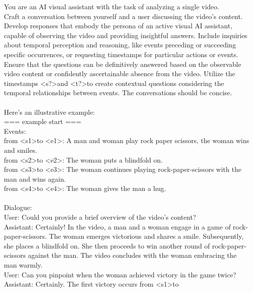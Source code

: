 \documentclass[10pt,twocolumn,letterpaper]{article}
\begin{document}
\begin{figure*}[t]
\begin{tcolorbox}[colback=gray!20, colframe=black, text width=0.9\textwidth, title={Box 3: Templates to transform events  into QA dialogues, 10 templates for each task.}]
\end{tcolorbox}

\end{figure*} \begin{figure*}[t] \centering

\begin{tcolorbox}[colback=gray!20, colframe=black, text width=0.9\textwidth, title={Box 4: Prompt for LLM in Stage 3, designed to transform a series of events into high-quality dialogue.}]
\hypertarget{box4}{}

You are an AI visual assistant with the task of analyzing a single video.\\Craft a conversation between yourself and a user discussing the video's content. Develop responses that embody the persona of an active visual AI assistant, capable of observing the video and providing insightful answers. Include inquiries about temporal perception and reasoning, like events preceding or succeeding specific occurrences, or requesting timestamps for particular actions or events.\\Ensure that the questions can be definitively answered based on the observable video content or confidently ascertainable absence from the video. Utilize the timestamps \textless s?\textgreater  and \textless t?\textgreater  to create contextual questions considering the temporal relationships between events. The conversations should be concise.\\\\Here's an illustrative example:\\=== example start ===\\Events:\\from \textless s1\textgreater  to \textless e1\textgreater : A man and woman play rock paper scissors, the woman wins and smiles.\\from \textless s2\textgreater  to \textless e2\textgreater : The woman puts a blindfold on.\\from \textless s3\textgreater  to \textless e3\textgreater : The woman continues playing rock-paper-scissors with the man and wins again.\\from \textless s4\textgreater  to \textless e4\textgreater : The woman gives the man a hug.\\\\Dialogue:\\User: Could you provide a brief overview of the video's content?\\Assistant: Certainly! In the video, a man and a woman engage in a game of rock-paper-scissors. The woman emerges victorious and shares a smile. Subsequently, she places a blindfold on. She then proceeds to win another round of rock-paper-scissors against the man. The video concludes with the woman embracing the man warmly.\\User: Can you pinpoint when the woman achieved victory in the game twice?\\Assistant: Certainly. The first victory occurs from \textless s1\textgreater  to 
\end{tcolorbox}
\end{figure*}
\end{document}
